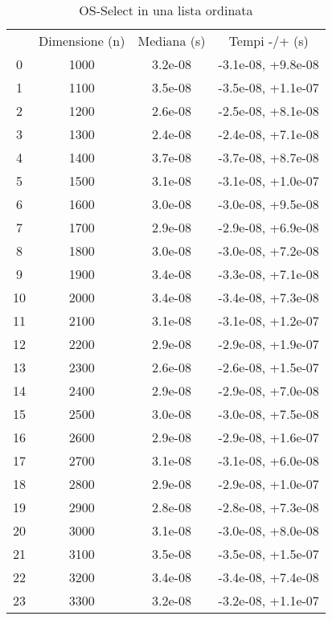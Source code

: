 \begin{table}
\centering
\caption{OS-Select in una lista ordinata}
\label{OS-Select in una lista ordinata}
\begin{adjustbox}{width=1\textwidth/2}
\begin{tabular}{|c|c|c|c|}
\hline
 & Dimensione (n) & Mediana (s) & Tempi -/+ (s) \\
0 & 1000 & 3.2e-08 & -3.1e-08, +9.8e-08 \\
\cline{1-4}
1 & 1100 & 3.5e-08 & -3.5e-08, +1.1e-07 \\
\cline{1-4}
2 & 1200 & 2.6e-08 & -2.5e-08, +8.1e-08 \\
\cline{1-4}
3 & 1300 & 2.4e-08 & -2.4e-08, +7.1e-08 \\
\cline{1-4}
4 & 1400 & 3.7e-08 & -3.7e-08, +8.7e-08 \\
\cline{1-4}
5 & 1500 & 3.1e-08 & -3.1e-08, +1.0e-07 \\
\cline{1-4}
6 & 1600 & 3.0e-08 & -3.0e-08, +9.5e-08 \\
\cline{1-4}
7 & 1700 & 2.9e-08 & -2.9e-08, +6.9e-08 \\
\cline{1-4}
8 & 1800 & 3.0e-08 & -3.0e-08, +7.2e-08 \\
\cline{1-4}
9 & 1900 & 3.4e-08 & -3.3e-08, +7.1e-08 \\
\cline{1-4}
10 & 2000 & 3.4e-08 & -3.4e-08, +7.3e-08 \\
\cline{1-4}
11 & 2100 & 3.1e-08 & -3.1e-08, +1.2e-07 \\
\cline{1-4}
12 & 2200 & 2.9e-08 & -2.9e-08, +1.9e-07 \\
\cline{1-4}
13 & 2300 & 2.6e-08 & -2.6e-08, +1.5e-07 \\
\cline{1-4}
14 & 2400 & 2.9e-08 & -2.9e-08, +7.0e-08 \\
\cline{1-4}
15 & 2500 & 3.0e-08 & -3.0e-08, +7.5e-08 \\
\cline{1-4}
16 & 2600 & 2.9e-08 & -2.9e-08, +1.6e-07 \\
\cline{1-4}
17 & 2700 & 3.1e-08 & -3.1e-08, +6.0e-08 \\
\cline{1-4}
18 & 2800 & 2.9e-08 & -2.9e-08, +1.0e-07 \\
\cline{1-4}
19 & 2900 & 2.8e-08 & -2.8e-08, +7.3e-08 \\
\cline{1-4}
20 & 3000 & 3.1e-08 & -3.0e-08, +8.0e-08 \\
\cline{1-4}
21 & 3100 & 3.5e-08 & -3.5e-08, +1.5e-07 \\
\cline{1-4}
22 & 3200 & 3.4e-08 & -3.4e-08, +7.4e-08 \\
\cline{1-4}
23 & 3300 & 3.2e-08 & -3.2e-08, +1.1e-07 \\

\end{tabular}
\end{adjustbox}
\end{table}
